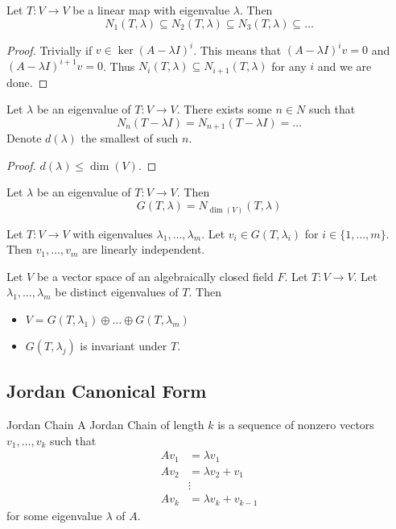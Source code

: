 \documentclass[a4paper]{article}
\begin{document}
\begin{prp}{}{} Let $T:V\to V$ be a linear map with eigenvalue $\lambda$. Then $$N_1(T,\lambda)\subseteq N_2(T,\lambda)\subseteq N_3(T,\lambda)\subseteq\dots$$ \tcbline
\begin{proof}
Trivially if $v\in\ker(A-\lambda I)^i$. This means that $(A-\lambda I)^iv=0$ and $(A-\lambda I)^{i+1}v=0$. Thus $N_i(T,\lambda)\subseteq N_{i+1}(T,\lambda)$ for any $i$ and we are done. 
\end{proof}
\end{prp}

\begin{prp}{}{} Let $\lambda$ be an eigenvalue of $T:V\to V$. There exists some $n\in N$ such that $$N_n(T-\lambda I)=N_{n+1}(T-\lambda I)=\dots$$ Denote $d(\lambda)$ the smallest of such $n$. \tcbline
\begin{proof}
$d(\lambda)\leq\dim(V)$. 
\end{proof}
\end{prp}

\begin{prp}{}{} Let $\lambda$ be an eigenvalue of $T:V\to V$. Then $$G(T,\lambda)=N_{\dim(V)}(T,\lambda)$$
\end{prp}

\begin{prp}{}{} Let $T:V\to V$ with eigenvalues $\lambda_1,\dots,\lambda_m$. Let $v_i\in G(T,\lambda_i)$ for $i\in\{1,\dots,m\}$. Then $v_1,\dots,v_m$ are linearly independent. 
\end{prp}

\begin{thm}{}{} Let $V$ be a vector space of an algebraically closed field $F$. Let $T:V\to V$. Let $\lambda_1,\dots,\lambda_m$ be distinct eigenvalues of $T$. Then
\begin{itemize}
\item $V=G(T,\lambda_1)\oplus\dots\oplus G(T,\lambda_m)$
\item $G(T,\lambda_j)$ is invariant under $T$. 
\end{itemize}
\end{thm}

\subsection{Jordan Canonical Form}
\begin{defn}{Jordan Chain}{} A Jordan Chain of length $k$ is a sequence of nonzero vectors $v_1,\dots,v_k$ such that
\begin{align*}
Av_1&=\lambda v_1\\
Av_2&=\lambda v_2+v_1\\
&\vdots\\
Av_k&=\lambda v_k+v_{k-1}
\end{align*}
for some eigenvalue $\lambda$ of $A$. 
\end{defn}
\end{document}
